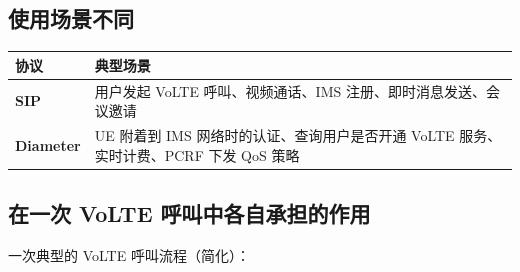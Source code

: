 \documentclass[12pt,a4paper]{ctexart}
\begin{document}
\subsection{使用场景不同}

\begin{table}[htbp]
\centering
\scriptsize
\begin{tabular}{>{\bfseries}p{2.5cm} p{11.5cm}}
\toprule
\textbf{协议} & \textbf{典型场景} \\
\midrule
SIP &
用户发起 VoLTE 呼叫、视频通话、IMS 注册、即时消息发送、会议邀请 \\
\addlinespace
Diameter &
UE 附着到 IMS 网络时的认证、查询用户是否开通 VoLTE 服务、实时计费、PCRF 下发 QoS 策略 \\
\bottomrule
\end{tabular}
\end{table}

\subsection{在一次 VoLTE 呼叫中各自承担的作用}

一次典型的 VoLTE 呼叫流程（简化）：
\end{document}
